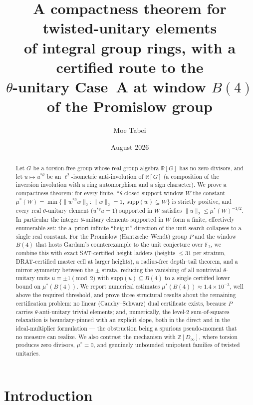 \documentclass[11pt]{article}
\title{A compactness theorem for twisted-unitary elements\\
of integral group rings, with a certified route to the\\
$\theta$-unitary Case~A at window $B(4)$ of the Promislow group}
\author{Moe Tabei}
\date{August 2026}
\newcommand{\ZZ}{\mathbb{Z}}
\newcommand{\RR}{\mathbb{R}}
\newcommand{\thst}{{*\theta}}
\newcommand{\supp}{\mathrm{supp}}
\begin{document}
\maketitle

\begin{abstract}
Let $G$ be a torsion-free group whose real group algebra $\RR[G]$ has no
zero divisors, and let $u\mapsto u^{\thst}$ be an $\ell^2$-isometric
anti-involution of $\RR[G]$ (a composition of the inversion involution
with a ring automorphism and a sign character).  We prove a compactness
theorem: for every finite, $\thst$-closed support window $W$ the
constant
$\mu^*(W)=\min\{\|w^{\thst}w\|_2 : \|w\|_2=1,\ \supp(w)\subseteq W\}$
is strictly positive, and every real $\theta$-unitary element
($u^{\thst}u=1$) supported in $W$ satisfies
$\|u\|_2\le \mu^*(W)^{-1/2}$.  In particular the integer
$\theta$-unitary elements supported in $W$ form a finite, effectively
enumerable set: the a~priori infinite ``height'' direction of the unit
search collapses to a single real constant.  For the Promislow
(Hantzsche--Wendt) group $P$ and the window $B(4)$ that hosts Gardam's
counterexample to the unit conjecture over $\mathbb{F}_2$, we combine
this with exact SAT-certified height ladders (heights $\le 31$
per stratum, DRAT-certified master cell at larger heights), a
radius-free depth--tail theorem, and a mirror symmetry between the
$\pm$ strata, reducing the vanishing of all nontrivial $\theta$-unitary
units $u\equiv\pm1\pmod 2$ with $\supp(u)\subseteq B(4)$ to a single
certified lower bound on $\mu^*(B(4))$.  We report numerical estimates
$\mu^*(B(4))\approx 1.4\times10^{-3}$, well above the required
threshold, and prove three structural results about the remaining
certification problem: no linear (Cauchy--Schwarz) dual certificate
exists, because $P$ carries $\theta$-anti-unitary trivial elements;
and, numerically, the level-2 sum-of-squares relaxation is
boundary-pinned with an explicit slope, both in the direct and in the
ideal-multiplier formulation --- the obstruction being a spurious
pseudo-moment that no measure can realize.  We also contrast the
mechanism with $\ZZ[D_\infty]$, where torsion produces zero divisors,
$\mu^*=0$, and genuinely unbounded unipotent families of twisted
unitaries.
\end{abstract}

\section{Introduction}
\end{document}
